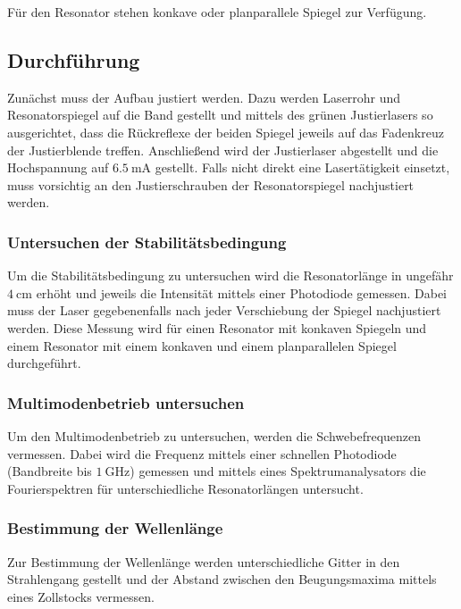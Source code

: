 Für den Resonator stehen konkave oder planparallele Spiegel zur Verfügung. 

\subsection{Durchführung}

Zunächst muss der Aufbau justiert werden. Dazu werden Laserrohr und Resonatorspiegel auf die Band gestellt und mittels des grünen
Justierlasers so ausgerichtet, dass die Rückreflexe der beiden Spiegel jeweils auf das Fadenkreuz der Justierblende treffen. 
Anschließend wird der Justierlaser abgestellt und die Hochspannung auf $\SI{6.5}{\milli\ampere}$ gestellt. 
Falls nicht direkt eine Lasertätigkeit einsetzt, muss vorsichtig an den Justierschrauben der Resonatorspiegel nachjustiert werden.

\subsubsection{Untersuchen der Stabilitätsbedingung}

Um die Stabilitätsbedingung zu untersuchen wird die Resonatorlänge in ungefähr $\SI{4}{\centi\metre}$ erhöht und jeweils die
Intensität mittels einer Photodiode gemessen. Dabei muss der Laser gegebenenfalls nach jeder Verschiebung der Spiegel nachjustiert
werden. Diese Messung wird für einen Resonator mit konkaven Spiegeln und einem Resonator mit einem konkaven und einem planparallelen
Spiegel durchgeführt.

\subsubsection{Multimodenbetrieb untersuchen}

Um den Multimodenbetrieb zu untersuchen, werden die Schwebefrequenzen vermessen. Dabei wird die Frequenz mittels einer schnellen 
Photodiode (Bandbreite bis $\SI{1}{\giga\hertz}$) gemessen und mittels eines Spektrumanalysators die Fourierspektren für 
unterschiedliche Resonatorlängen untersucht. 

\subsubsection{Bestimmung der Wellenlänge}

Zur Bestimmung der Wellenlänge werden unterschiedliche Gitter in den Strahlengang gestellt und der Abstand zwischen den Beugungsmaxima
mittels eines Zollstocks vermessen. 

